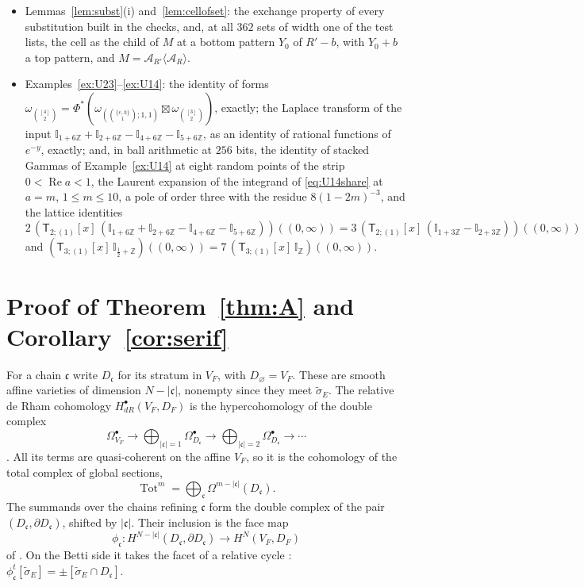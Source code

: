 \documentclass[11pt]{article}
\theoremstyle{plain}
\theoremstyle{definition}
\theoremstyle{remark}
\newcommand{\Z}{\mathbb Z}
\newcommand{\tsig}{\widetilde\sigma}
\newcommand{\sT}{\mathsf T}
\newcommand{\IZ}{\mathbb I_{\mathbb Z}}
\newcommand{\Ilat}[1]{\mathbb I_{#1}}
\newcommand{\Tx}[3]{(\sT_{#1;(1)}[x]\,#2)((#3,\infty))}
\DeclareMathOperator{\re}{Re}
\begin{document}
\begin{itemize}
\item Lemmas~\ref{lem:subst}(i) and~\ref{lem:cellofset}: the exchange property of every substitution built in the checks, and, at all $362$ sets of width one of the test lists, the cell as the child of $M$ at a bottom pattern $Y_0$ of $R'-b$, with $Y_0+b$ a top pattern, and $M=\mathcal A_{R'}\langle\mathcal A_R\rangle$.
\item Examples~\ref{ex:U23}--\ref{ex:U14}: the identity of forms $\omega_{\binom{[4]}2}=\Phi^\ast(\omega_{(\binom{\{e,h\}}1;1,1)}\boxtimes\omega_{\binom{[3]}2})$, exactly; the Laplace transform of the input $\Ilat{1+6\Z}+\Ilat{2+6\Z}-\Ilat{4+6\Z}-\Ilat{5+6\Z}$, as an identity of rational functions of $e^{-y}$, exactly; and, in ball arithmetic at $256$ bits, the identity of stacked Gammas of Example~\ref{ex:U14} at eight random points of the strip $0<\re a<1$, the Laurent expansion of the integrand of \eqref{eq:U14share} at $a=m$, $1\le m\le10$, a pole of order three with the residue $8(1-2m)^{-3}$, and the lattice identities $2\,\Tx{2}{(\Ilat{1+6\Z}+\Ilat{2+6\Z}-\Ilat{4+6\Z}-\Ilat{5+6\Z})}{0}=3\,\Tx{2}{(\Ilat{1+3\Z}-\Ilat{2+3\Z})}{0}$ and $\Tx{3}{\Ilat{\frac12+\Z}}{0}=7\,\Tx{3}{\IZ}{0}$.
\end{itemize}

\section{Proof of Theorem~\ref{thm:A} and Corollary~\ref{cor:serif}}\label{sec:proofA}

For a chain $\mathfrak c$ write $D_{\mathfrak c}$ for its stratum in $V_F$, with $D_\varnothing=V_F$. These are smooth affine varieties of dimension $N-|\mathfrak c|$, nonempty since they meet $\tsig_E$. The relative de Rham cohomology $H^\bullet_{dR}(V_F,D_F)$ is the hypercohomology of the double complex
\[
\Omega^\bullet_{V_F}\to\bigoplus_{|\mathfrak c|=1}\Omega^\bullet_{D_{\mathfrak c}}\to\bigoplus_{|\mathfrak c|=2}\Omega^\bullet_{D_{\mathfrak c}}\to\cdots
\]
\cite[\S10.2]{B1}. All its terms are quasi-coherent on the affine $V_F$, so it is the cohomology of the total complex of global sections,
\[
\operatorname{Tot}^m=\bigoplus_{\mathfrak c}\Omega^{m-|\mathfrak c|}(D_{\mathfrak c}).
\]
The summands over the chains refining $\mathfrak c$ form the double complex of the pair $(D_{\mathfrak c},\partial D_{\mathfrak c})$, shifted by $|\mathfrak c|$. Their inclusion is the face map
\[
\phi_{\mathfrak c}:H^{N-|\mathfrak c|}(D_{\mathfrak c},\partial D_{\mathfrak c})\to H^N(V_F,D_F)
\]
of \cite[(10.3)]{B1}. On the Betti side it takes the facet of a relative cycle \cite[Cor.~5.2, proof of Thm.~7.8]{B2}: $\phi_{\mathfrak c}^t[\tsig_E]=\pm[\tsig_E\cap D_{\mathfrak c}]$.
\end{document}
